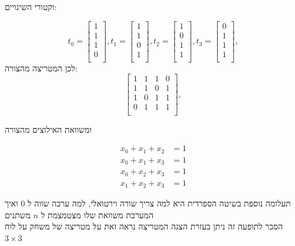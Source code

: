 \documentclass[12pt,twoside]{article}
\begin{document}
וקטורי השינויים:

\[
   t_0 = 
    \begin{bmatrix}
        1 \\
        1 \\
        1 \\
        0 \\
    \end{bmatrix},
    t_1 = 
    \begin{bmatrix}
        1 \\
        1 \\
        0 \\
        1 \\
    \end{bmatrix},
    t_2 = 
    \begin{bmatrix}
        1 \\
        0 \\
        1 \\
        1 \\
    \end{bmatrix},
    t_3 = 
    \begin{bmatrix}
        0 \\
        1 \\
        1 \\
        1 \\
    \end{bmatrix},
\]
לכן
המטריצה מהצורה:
\[
    \begin{bmatrix}
        1 & 1 & 1 &0 \\
        1 & 1 & 0 & 1 \\
        1 & 0 & 1 & 1 \\
        0 & 1 & 1 & 1 \\
    \end{bmatrix},
\]

ומשוואת האילוצים
מהצורה 

\begin{align*}
    x_0 + x_1 + x_2 &= 1\\
    x_0 + x_1 + x_3 &= 1\\
    x_0 + x_2 + x_3 &= 1\\
    x_1 + x_2 + x_3 &= 1
\end{align*}

תעלומה נוספת בשיטה הספרדית היא למה צריך שורה וירטואלי, למה ערכה 
שווה ל
$0$
ואיך המערכת משוואת שלו מצטמצמת ל
$n$
משתנים
\\
הסבר לתופעה זה
ניתן בעזרת הצגה המטריצה
נראה זאת על מטריצה 
של משחק 
על לוח 
$3 \times 3$
\end{document}

